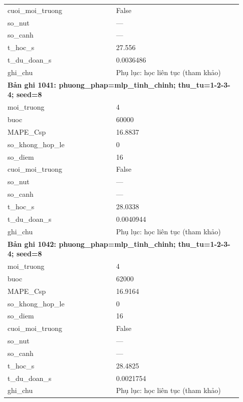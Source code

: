 \begin{longtable}{p{0.43\linewidth}p{0.50\linewidth}}
cuoi\_\allowbreak moi\_\allowbreak truong & False \\
so\_\allowbreak nut & — \\
so\_\allowbreak canh & — \\
t\_\allowbreak hoc\_\allowbreak s & 27.556 \\
t\_\allowbreak du\_\allowbreak doan\_\allowbreak s & 0.0036486 \\
ghi\_\allowbreak chu & Phụ lục: học liên tục (tham khảo) \\
\midrule
\multicolumn{2}{p{0.95\linewidth}}{\textbf{Bản ghi 1041: phuong\_phap=mlp\_tinh\_chinh; thu\_tu=1-2-3-4; seed=8}} \\
moi\_\allowbreak truong & 4 \\
buoc & 60000 \\
MAPE\_\allowbreak Csp & 16.8837 \\
so\_\allowbreak khong\_\allowbreak hop\_\allowbreak le & 0 \\
so\_\allowbreak diem & 16 \\
cuoi\_\allowbreak moi\_\allowbreak truong & False \\
so\_\allowbreak nut & — \\
so\_\allowbreak canh & — \\
t\_\allowbreak hoc\_\allowbreak s & 28.0338 \\
t\_\allowbreak du\_\allowbreak doan\_\allowbreak s & 0.0040944 \\
ghi\_\allowbreak chu & Phụ lục: học liên tục (tham khảo) \\
\midrule
\multicolumn{2}{p{0.95\linewidth}}{\textbf{Bản ghi 1042: phuong\_phap=mlp\_tinh\_chinh; thu\_tu=1-2-3-4; seed=8}} \\
moi\_\allowbreak truong & 4 \\
buoc & 62000 \\
MAPE\_\allowbreak Csp & 16.9164 \\
so\_\allowbreak khong\_\allowbreak hop\_\allowbreak le & 0 \\
so\_\allowbreak diem & 16 \\
cuoi\_\allowbreak moi\_\allowbreak truong & False \\
so\_\allowbreak nut & — \\
so\_\allowbreak canh & — \\
t\_\allowbreak hoc\_\allowbreak s & 28.4825 \\
t\_\allowbreak du\_\allowbreak doan\_\allowbreak s & 0.0021754 \\
ghi\_\allowbreak chu & Phụ lục: học liên tục (tham khảo) \\

\end{longtable}
